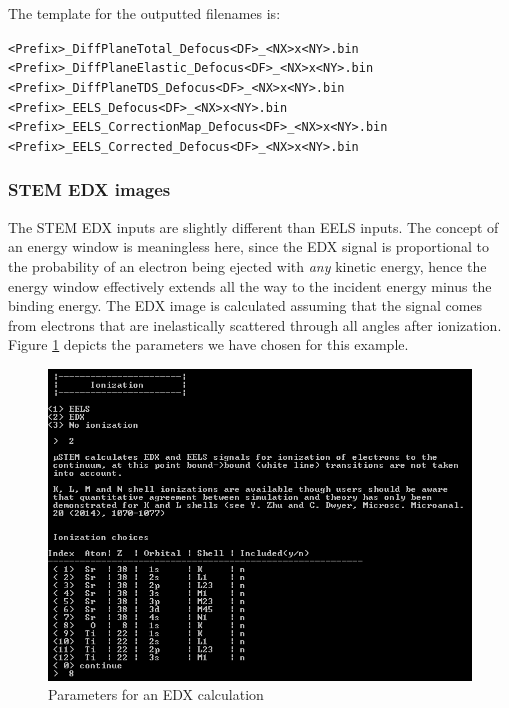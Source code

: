 \documentclass[12pt,a4paper]{article}
\newenvironment{myenv}{\begin{samepage}\begin{adjustwidth}{2cm}{}}{\end{adjustwidth}\end{samepage}}
\begin{document}
The template for the outputted filenames is:
%
\begin{myenv}
    \verb|<Prefix>_DiffPlaneTotal_Defocus<DF>_<NX>x<NY>.bin| \\
    \verb|<Prefix>_DiffPlaneElastic_Defocus<DF>_<NX>x<NY>.bin| \\
    \verb|<Prefix>_DiffPlaneTDS_Defocus<DF>_<NX>x<NY>.bin| \\
    \verb|<Prefix>_EELS_Defocus<DF>_<NX>x<NY>.bin| \\
    \verb|<Prefix>_EELS_CorrectionMap_Defocus<DF>_<NX>x<NY>.bin| \\
    \verb|<Prefix>_EELS_Corrected_Defocus<DF>_<NX>x<NY>.bin| \\
\end{myenv}
%

\subsubsection{STEM EDX images}

The STEM EDX inputs are slightly different than EELS inputs.
The concept of an energy window is meaningless here, since the EDX signal is proportional to the probability of an electron being ejected with \emph{any} kinetic energy, hence the energy window effectively extends all the way to the incident energy minus the binding energy.
The EDX image is calculated assuming that the signal comes from electrons that are inelastically scattered through all angles after ionization.
Figure \ref{fig:cb_abs_EDX} depicts the parameters we have chosen for this example.

\begin{figure}[!h]
\begin{center}
    \includegraphics[scale=0.75]{figures/cb_abs_EDX.png}
\caption{Parameters for an EDX calculation}
\label{fig:cb_abs_EDX}
\end{center}
\end{figure}
\end{document}
